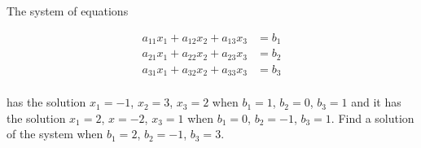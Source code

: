 The system of equations

$$
  \begin{aligned}
    a_{11} x_1 + a_{12} x_2 + a_{13} x_3 &= b_1 \\
    a_{21} x_1 + a_{22} x_2 + a_{23} x_3 &= b_2 \\
    a_{31} x_1 + a_{32} x_2 + a_{33} x_3 &= b_3 \\
  \end{aligned}
$$

has the solution $x_1 = -1$, $x_2 = 3$, $x_3 = 2$ when $b_1 = 1$, $b_2 = 0$,
$b_3 = 1$ and it has the solution $x_1 = 2$, $x = -2$, $x_3 = 1$ when $b_1 =
0$, $b_2 = -1$, $b_3 = 1$. Find a solution of the system when $b_1 = 2$, $b_2 =
-1$, $b_3 = 3$.
